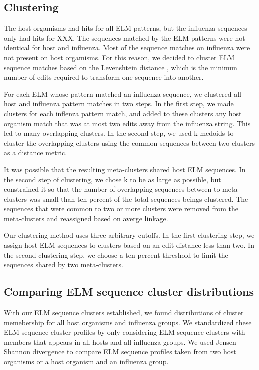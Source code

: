 \documentclass[10pt]{bmc_article}
\newenvironment{bmcformat}{\begin{raggedright}\baselineskip20pt\sloppy\setboolean{publ}{false}}{\end{raggedright}\baselineskip20pt\sloppy}
\begin{document}
\begin{bmcformat}
\subsection*{Clustering}
The host orgamisms had hits for all ELM patterns, but the influenza
sequences only had hits for XXX. The sequences matched by the ELM
patterns were not identical for host and influenza. Most of the
sequence matches on influenza were not present on host orgamisms. For
this reason, we decided to cluster ELM sequence matches based on the
Levenshtein distance \cite{levenshteiti1966binary}, which is the
minimun number of edits required to transform one sequence into
another.

For each ELM whose pattern matched an influenza sequence, we clustered
all host and influenza pattern matches in two steps.  In the first
step, we made clusters for each inflenza pattern match, and added to
these clusters any host organism match that was at most two edits away
from the influenza string. This led to many overlapping clusters. In
the second step, we used k-medoids to cluster the overlapping clusters
using the common sequences between two clusters as a distance
metric. 

It was possible that the resulting meta-clusters shared host
ELM sequences. In the second step of clustering, we chose k to be as
large as possible, but constrained it so that the number of
overlapping sequences between to meta-clusters was small than ten
percent of the total sequences beings clustered. The sequences that
were common to two or more clusters were removed from the
meta-clusters and reassigned based on averge linkage.

Our clustering method uses three arbitrary cutoffs. In the first
clustering step, we assign host ELM sequences to clusters based on an
edit distance less than two. In the second clustering step, we choose
a ten percent threshold to limit the sequences shared by two
meta-clusters.

\subsection*{Comparing ELM sequence cluster distributions}
With our ELM sequence clusters established, we found distributions of
cluster memebership for all host organisms and influenza groups.  We
standardized these ELM sequence cluster profiles by only considering
ELM sequence clusters with members that appears in all hosts and all
influenza groups. We used Jensen-Shannon divergence
\cite{lin1991divergence} to compare ELM sequence profiles taken from
two host organisms or a host organism and an influenza group.
  

\end{bmcformat}
\end{document}
